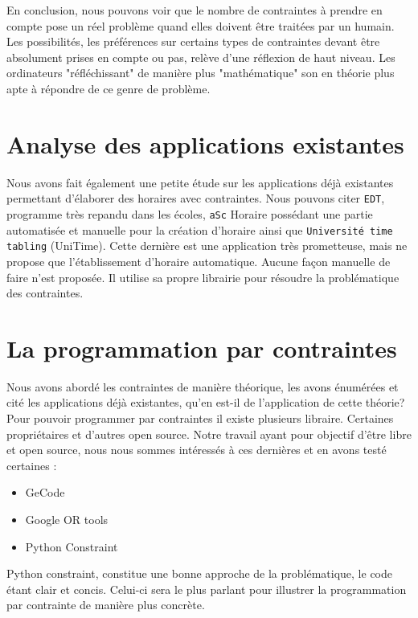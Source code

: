 En conclusion, nous pouvons voir que le nombre de contraintes à prendre en compte pose un réel problème quand elles doivent être traitées par un humain. Les possibilités, les préférences sur certains types de contraintes devant être absolument prises en compte ou pas, relève d'une réflexion de haut niveau. Les ordinateurs "réfléchissant" de manière plus "mathématique" son en théorie plus apte à répondre de ce genre de problème.

\section{Analyse des applications existantes}
Nous avons fait également une petite étude sur les applications déjà existantes permettant d'élaborer des horaires avec contraintes. Nous pouvons citer \texttt{EDT}, programme très repandu dans les écoles, \texttt{aSc} Horaire possédant une partie automatisée et manuelle pour la création d'horaire ainsi que \texttt{Université time tabling} (UniTime). Cette dernière est une application très prometteuse, mais ne propose que l'établissement d'horaire automatique. Aucune façon manuelle de faire n'est proposée. Il utilise sa propre librairie pour résoudre la problématique des contraintes.

\section{La programmation par contraintes}
Nous avons abordé les contraintes de manière théorique, les avons énumérées et cité les applications déjà existantes, qu'en est-il de l'application de cette théorie? Pour pouvoir programmer par contraintes il existe plusieurs libraire. Certaines propriétaires et d'autres open source. Notre travail ayant pour objectif d'être libre et open source, nous nous sommes intéressés à ces dernières et en avons testé certaines :\\
\begin{itemize}
\item GeCode
\item Google OR tools
\item Python Constraint
\end{itemize}
\bigskip

Python constraint, constitue une bonne approche de la problématique, le code étant clair et concis. Celui-ci sera le plus parlant pour illustrer la programmation par contrainte de manière plus concrète.

